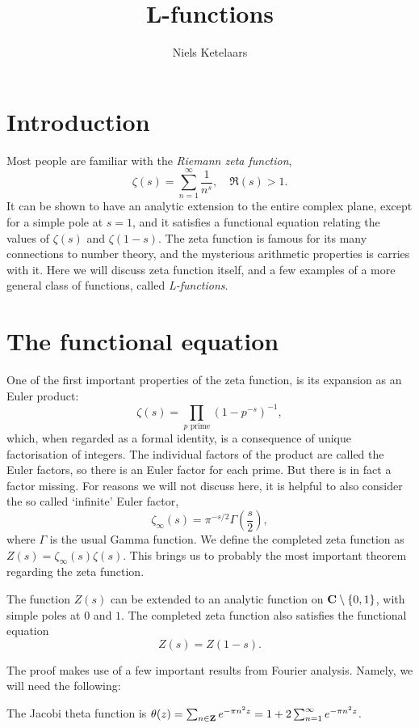 \documentclass{amsart}
\title{L-functions}
\author{Niels Ketelaars}
\begin{document}
\maketitle

\section{Introduction}
Most people are familiar with the \emph{Riemann zeta function},
\[\zeta(s) = \sum_{n=1}^\infty \frac{1}{n^s}, \quad \Re(s) > 1. \]
It can be shown to have an analytic extension to the entire complex plane, except for a simple pole at $s=1$, and it satisfies a functional equation relating the values of $\zeta(s)$ and $\zeta(1-s)$. The zeta function is famous for its many connections to number theory, and the mysterious arithmetic properties is carries with it. Here we will discuss zeta function itself, and a few examples of a more general class of functions, called \emph{L-functions}.

\section{The functional equation}
One of the first important properties of the zeta function, is its expansion as an Euler product:
\[ \zeta(s) = \prod_{p \text{ prime}} (1-p^{-s})^{-1}, \]
which, when regarded as a formal identity, is a consequence of unique factorisation of integers. The individual factors of the product are called the Euler factors, so there is an Euler factor for each prime. But there is in fact a factor missing. For reasons we will not discuss here, it is helpful to also consider the so called `infinite' Euler factor,
\[\zeta_\infty(s) = \pi^{-s/2}\Gamma\left(\frac{s}{2}\right), \]
where $\Gamma$ is the usual Gamma function. We define the completed zeta function as $Z(s) = \zeta_\infty(s)\zeta(s)$. This brings us to probably the most important theorem regarding the zeta function.
\begin{theorem}
\label{thm:zetaeq}
The function $Z(s)$ can be extended to an analytic function on $\mathbf{C}\setminus\{0,1\}$, with simple poles at $0$ and $1$. The completed zeta function also satisfies the functional equation
\[Z(s) = Z(1-s). \]
\end{theorem}

The proof makes use of a few important results from Fourier analysis. Namely, we will need the following:
\begin{defi}
  \label{def:theta}
  The Jacobi theta function is $\theta(z) = \sum_{n\in \mathbf{Z}} e^{-\pi n^2 z} = 1+ 2\sum_{n=1}^\infty e^{-\pi n^2 z}$.
\end{defi}
\end{document}
